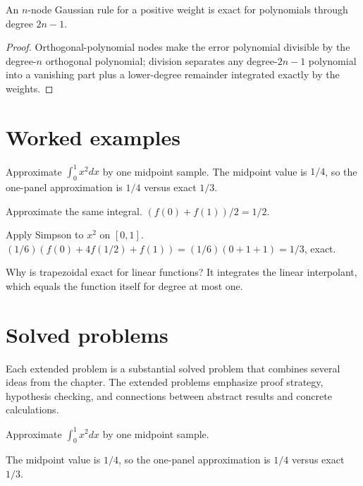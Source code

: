 \begin{theorem}\label{thm:ii24-03}
An $n$-node Gaussian rule for a positive weight is exact for polynomials through degree $2n-1$.
\begin{proof}
Orthogonal-polynomial nodes make the error polynomial divisible by the degree-$n$ orthogonal polynomial; division separates any degree-$2n-1$ polynomial into a vanishing part plus a lower-degree remainder integrated exactly by the weights.
\end{proof}
\end{theorem}

\section{Worked examples}

\begin{example}\label{ex:ii24-worked-01}
Approximate $\int_0^1x^2dx$ by one midpoint sample. The midpoint value is $1/4$, so the one-panel approximation is $1/4$ versus exact $1/3$.
\end{example}

\begin{example}\label{ex:ii24-worked-02}
Approximate the same integral. $(f(0)+f(1))/2=1/2$.
\end{example}

\begin{example}\label{ex:ii24-worked-03}
Apply Simpson to $x^2$ on $[0,1]$. $(1/6)(f(0)+4f(1/2)+f(1))=(1/6)(0+1+1)=1/3$, exact.
\end{example}

\begin{example}\label{ex:ii24-worked-04}
Why is trapezoidal exact for linear functions? It integrates the linear interpolant, which equals the function itself for degree at most one.
\end{example}

\section{Solved problems}
Each extended problem is a substantial solved problem that combines several ideas from the chapter. The extended problems emphasize proof strategy, hypothesis checking, and connections between abstract results and concrete calculations.

\begin{problem}\label{prob:ii24-problem-01}
Approximate $\int_0^1x^2dx$ by one midpoint sample.
\end{problem}
\begin{solution}
The midpoint value is $1/4$, so the one-panel approximation is $1/4$ versus exact $1/3$.
\end{solution}

